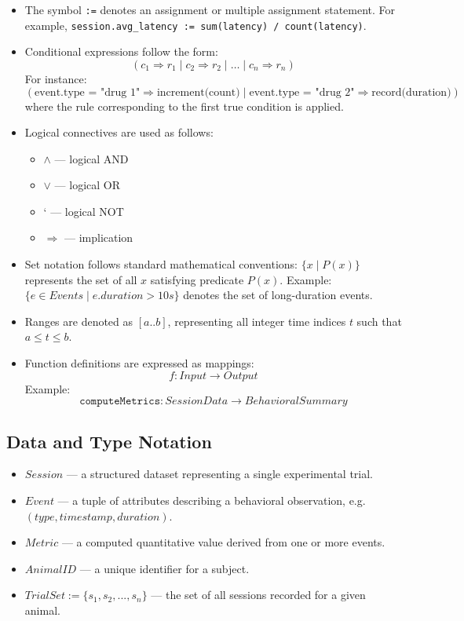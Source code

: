 \documentclass[12pt, titlepage]{article}
\begin{document}
\begin{itemize}
    \item The symbol \texttt{:=} denotes an assignment or multiple assignment statement.  
    For example, \texttt{session.avg\_latency := sum(latency) / count(latency)}.

    \item Conditional expressions follow the form:
    \[
        (c_1 \Rightarrow r_1 \;|\; c_2 \Rightarrow r_2 \;|\; \dots \;|\; c_n \Rightarrow r_n)
    \]
    For instance:
    \[
        (\text{event.type = "drug 1"} \Rightarrow \text{increment(count)} \;|\; \text{event.type = "drug 2"} \Rightarrow \text{record(duration)})
    \]
    where the rule corresponding to the first true condition is applied.

    \item Logical connectives are used as follows:
    \begin{itemize}
        \item \(\land\) — logical AND  
        \item \(\lor\) — logical OR  
        \item ` — logical NOT  
        \item \(\Rightarrow\) — implication
    \end{itemize}

    \item Set notation follows standard mathematical conventions:  
    \(\{x \mid P(x)\}\) represents the set of all \(x\) satisfying predicate \(P(x)\).  
    Example:  
    \(\{ e \in Events \mid e.duration > 10s \}\) denotes the set of long-duration events.

    \item Ranges are denoted as \([a..b]\), representing all integer time indices \(t\) such that \(a \leq t \leq b\).

    \item Function definitions are expressed as mappings:  
    \[
        f : Input \rightarrow Output
    \]
    Example:  
    \[
        \texttt{computeMetrics} : SessionData \rightarrow BehavioralSummary
    \]
\end{itemize}

\subsection*{Data and Type Notation}

\begin{itemize}
    \item \(Session\) — a structured dataset representing a single experimental trial.  
    \item \(Event\) — a tuple of attributes describing a behavioral observation, e.g. \((type, timestamp, duration)\).
    \item \(Metric\) — a computed quantitative value derived from one or more events.
    \item \(AnimalID\) — a unique identifier for a subject.
    \item \(TrialSet := \{ s_1, s_2, ..., s_n \}\) — the set of all sessions recorded for a given animal.
\end{itemize}
\end{document}

